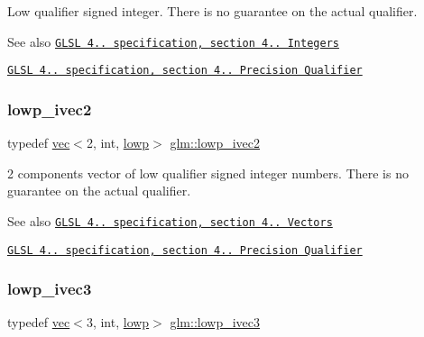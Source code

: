 Low qualifier signed integer. There is no guarantee on the actual qualifier.

\begin{DoxySeeAlso}{See also}
\href{http://www.opengl.org/registry/doc/GLSLangSpec.4.20.8.pdf}{\tt G\+L\+SL 4.. specification, section 4.. Integers} 

\href{http://www.opengl.org/registry/doc/GLSLangSpec.4.20.8.pdf}{\tt G\+L\+SL 4.. specification, section 4.. Precision Qualifier} 
\end{DoxySeeAlso}
\mbox{\label{group__core__precision_gab85314d1bfbed099461a545d5fb75be1}} 
\subsubsection{\texorpdfstring{lowp\+\_\+ivec2}{lowp\_ivec2}}
{\footnotesize\ttfamily typedef \mbox{\hyperlink{structglm_1_1vec}{vec}}$<$2, int, \mbox{\hyperlink{namespaceglm_a36ed105b07c7746804d7fdc7cc90ff25ae161af3fc695e696ce3bf69f7332bc2d}{lowp}}$>$ \mbox{\hyperlink{group__core__precision_gab85314d1bfbed099461a545d5fb75be1}{glm\+::lowp\+\_\+ivec2}}}

2 components vector of low qualifier signed integer numbers. There is no guarantee on the actual qualifier.

\begin{DoxySeeAlso}{See also}
\href{http://www.opengl.org/registry/doc/GLSLangSpec.4.20.8.pdf}{\tt G\+L\+SL 4.. specification, section 4.. Vectors} 

\href{http://www.opengl.org/registry/doc/GLSLangSpec.4.20.8.pdf}{\tt G\+L\+SL 4.. specification, section 4.. Precision Qualifier} 
\end{DoxySeeAlso}
\mbox{\label{group__core__precision_ga77f1494e08fca27e26aebbbfb8162298}} 
\subsubsection{\texorpdfstring{lowp\+\_\+ivec3}{lowp\_ivec3}}
{\footnotesize\ttfamily typedef \mbox{\hyperlink{structglm_1_1vec}{vec}}$<$3, int, \mbox{\hyperlink{namespaceglm_a36ed105b07c7746804d7fdc7cc90ff25ae161af3fc695e696ce3bf69f7332bc2d}{lowp}}$>$ \mbox{\hyperlink{group__core__precision_ga77f1494e08fca27e26aebbbfb8162298}{glm\+::lowp\+\_\+ivec3}}}

